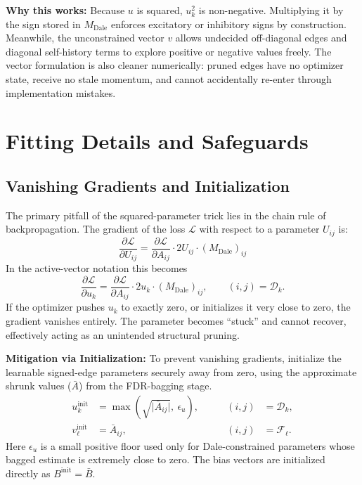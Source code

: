 \documentclass[11pt]{article}
\begin{document}
\textbf{Why this works:}
Because $u$ is squared, $u_k^2$ is non-negative. Multiplying it by the sign stored in $M_{\text{Dale}}$ enforces excitatory or inhibitory signs by construction. Meanwhile, the unconstrained vector $v$ allows undecided off-diagonal edges and diagonal self-history terms to explore positive or negative values freely. The vector formulation is also cleaner numerically: pruned edges have no optimizer state, receive no stale momentum, and cannot accidentally re-enter through implementation mistakes.

\section{Fitting Details and Safeguards}

\subsection{Vanishing Gradients and Initialization}

The primary pitfall of the squared-parameter trick lies in the chain rule of backpropagation. The gradient of the loss $\mathcal{L}$ with respect to a parameter $U_{ij}$ is:
\begin{equation}
\label{eq:dense-u-gradient}
\frac{\partial \mathcal{L}}{\partial U_{ij}} = \frac{\partial \mathcal{L}}{\partial A_{ij}} \cdot 2 U_{ij} \cdot (M_{\text{Dale}})_{ij}
\end{equation}
In the active-vector notation this becomes
\begin{equation}
\label{eq:active-u-gradient}
\frac{\partial \mathcal{L}}{\partial u_k}
= \frac{\partial \mathcal{L}}{\partial A_{ij}} \cdot 2u_k\cdot (M_{\text{Dale}})_{ij},
\qquad (i,j)=\mathcal{D}_k .
\end{equation}
If the optimizer pushes $u_k$ to exactly zero, or initializes it very close to zero, the gradient vanishes entirely. The parameter becomes ``stuck'' and cannot recover, effectively acting as an unintended structural pruning.

\textbf{Mitigation via Initialization:}
To prevent vanishing gradients, initialize the learnable signed-edge parameters securely away from zero, using the approximate shrunk values ($\bar{A}$) from the FDR-bagging stage.
\begin{equation}
\label{eq:active-init}
\begin{aligned}
u_k^{\text{init}} &= \max\!\left(\sqrt{\big| \bar{A}_{ij} \big|},\ \epsilon_u\right),
&\qquad (i,j)&=\mathcal{D}_k,\\
v_\ell^{\text{init}} &= \bar{A}_{ij},
&\qquad (i,j)&=\mathcal{F}_\ell .
\end{aligned}
\end{equation}
Here $\epsilon_u$ is a small positive floor used only for Dale-constrained parameters whose bagged estimate is extremely close to zero. The bias vectors are initialized directly as $B^{\text{init}} = \bar{B}$.
\end{document}
